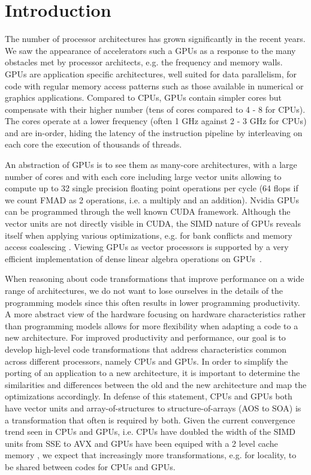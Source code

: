 \section{Introduction}
The number of processor architectures has grown significantly in the recent
years. We saw the appearance of accelerators such a GPUs as a response to the
many obstacles met by processor architects, e.g. the frequency and memory walls.
GPUs are application specific architectures, well suited for data parallelism,
for code with regular memory access patterns such as those available in
numerical or graphics applications. Compared to CPUs, GPUs contain simpler cores
but compensate with their higher number (tens of cores compared to 4 - 8 for
CPUs). The cores operate at a lower frequency (often 1 GHz against 2 - 3 GHz for
CPUs) and are in-order, hiding the latency of the instruction pipeline by
interleaving on each core the execution of thousands of threads.

An abstraction of GPUs is to see them as many-core architectures, with a large
number of cores and with each core including large vector units allowing to
compute up to 32 single precision floating point operations per cycle (64 flops
if we count FMAD as 2 operations, i.e. a multiply and an addition). Nvidia GPUs
can be programmed through the well known CUDA framework. Although the vector
units are not directly visible in CUDA, the SIMD nature of GPUs reveals itself
when applying various optimizations, e.g. for bank conflicts and memory access
coalescing \cite{cuda}. Viewing GPUs as vector processors is supported by a very
efficient implementation of dense linear algebra operations on
GPUs~\cite{Volkov:2008:BGT:1413370.1413402}.

When reasoning about code transformations that improve performance on a wide
range of architectures, we do not want to lose ourselves in the details of the
programming models since this often results in lower programming productivity.
A more abstract view of the hardware focusing on hardware characteristics rather
than programming models allows for more flexibility when adapting a code to a
new architecture. For improved productivity and performance, our goal is to
develop high-level code transformations that address characteristics common
across different processors, namely CPUs and GPUs. In order to simplify the
porting of an application to a new architecture, it is important to determine
the similarities and differences between the old and the new architecture and
map the optimizations accordingly. In defense of this statement, CPUs and GPUs
both have vector units and array-of-structures to structure-of-arrays (AOS to
SOA) is a transformation that often is required by both. Given the current
convergence trend seen in CPUs and GPUs, i.e. CPUs have doubled the width of the
SIMD units from SSE to AVX and GPUs have been equiped with a 2 level cache
memory \cite{fermi}, we expect that increasingly more transformations, e.g. for
locality, to be shared between codes for CPUs and GPUs.

